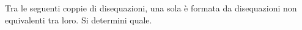 Tra le seguenti coppie di disequazioni, 
una sola è formata da disequazioni non equivalenti tra loro.
Si determini quale.